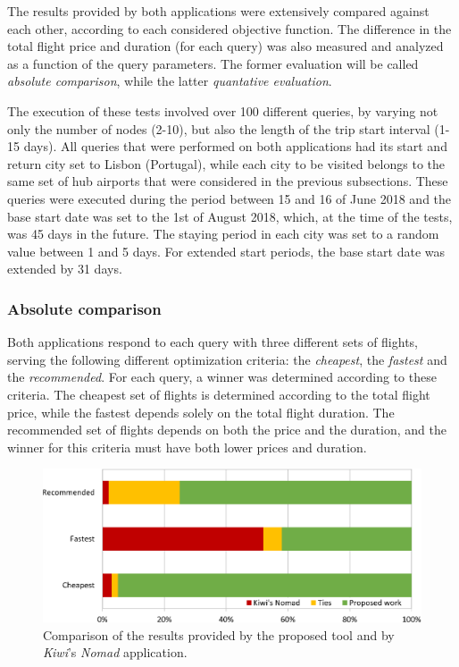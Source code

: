 \documentclass[onecolumn]{elsarticle}
\begin{document}
The results provided by both applications were extensively compared against each other, according to each considered objective function. The difference in the total flight price and duration (for each query) was also measured and analyzed as a function of the query parameters. The former evaluation will be called \textit{absolute comparison}, while the latter \textit{quantative evaluation}.

The execution of these tests involved over 100 different queries, by varying not only the number of nodes (2-10), but also the length of the trip start interval (1-15 days). All queries that were performed on both applications had its start and return city set to Lisbon (Portugal), while each city to be visited belongs to the same set of hub airports that were considered in the previous subsections. These queries were executed during the period between 15 and 16 of June 2018 and the base start date was set to the 1st of August 2018, which, at the time of the tests, was 45 days in the future. The staying period in each city was set to a random value between 1 and 5 days. For extended start periods, the base start date was extended by 31 days.


\subsubsection{Absolute comparison}

Both applications respond to each query with three different sets of flights, serving the following different optimization criteria: the \textit{cheapest}, the \textit{fastest} and the \textit{recommended}. For each query, a winner was determined according to these criteria. The cheapest set of flights is determined according to the total flight price, while the fastest depends solely on the total flight duration. The recommended set of flights depends on both the price and the duration, and the winner for this criteria must have both lower prices and duration. 

\begin{figure}
    \centering
    \includegraphics[width=1.0\columnwidth]{fig6.eps}
    \caption{Comparison of the results provided by the proposed tool and by \textit{Kiwi}'s \textit{Nomad} application.}
    \label{fig:quality_apis}
\end{figure}
\end{document}
